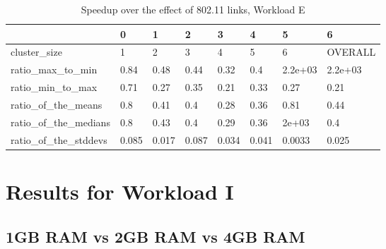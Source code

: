 \begin{table}[H]
\centering
\begin{tabular}{llllllll}
\toprule
{} &     0 &     1 &     2 &     3 &     4 &       5 &        6 \\
\midrule
cluster\_size         &     1 &     2 &     3 &     4 &     5 &       6 &  OVERALL \\
ratio\_max\_to\_min     &  0.84 &  0.48 &  0.44 &  0.32 &   0.4 & 2.2e+03 &  2.2e+03 \\
ratio\_min\_to\_max     &  0.71 &  0.27 &  0.35 &  0.21 &  0.33 &    0.27 &     0.21 \\
ratio\_of\_the\_means   &   0.8 &  0.41 &   0.4 &  0.28 &  0.36 &    0.81 &     0.44 \\
ratio\_of\_the\_medians &   0.8 &  0.43 &   0.4 &  0.29 &  0.36 &   2e+03 &      0.4 \\
ratio\_of\_the\_stddevs & 0.085 & 0.017 & 0.087 & 0.034 & 0.041 &  0.0033 &    0.025 \\
\bottomrule
\end{tabular}
\caption{Speedup over the effect of 802.11 links, Workload E}
\label{table:wlan_v_eth_e_speedup}
\end{table}





\section{Results for Workload I}
\subsection{1GB RAM vs 2GB RAM vs 4GB RAM}
